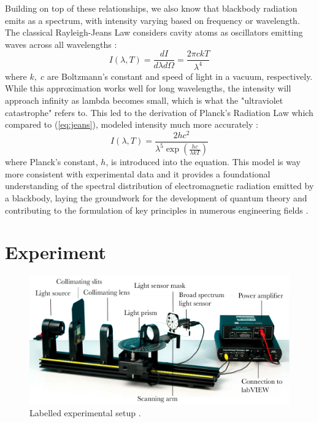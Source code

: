 \documentclass[12pt]{article}
\begin{document}
Building on top of these relationships, we also know that blackbody radiation emits as a spectrum, with intensity varying based on frequency or wavelength. The classical Rayleigh-Jeans Law considers cavity atoms as oscillators emitting waves across all wavelengths \autocite{manuall}:
\begin{equation}
    I(\lambda,T)=\frac{dI}{d\lambda d\Omega}=\frac{2\pi ckT}{\lambda^4}
    \label{eq:jeans}
\end{equation}
where $k,\;c$ are Boltzmann's constant and speed of light in a vacuum, respectively. While this approximation works well for long wavelengths, the intensity will approach infinity as lambda becomes small, which is what the "ultraviolet catastrophe" refers to. This led to the derivation of Planck's Radiation Law which compared to (\ref{eq:jeans}), modeled intensity much more accurately \autocite{planck1900theory}:
\begin{equation}
    I(\lambda,T)=\frac{2hc^2}{\lambda^5\exp\left(\frac{hc}{\lambda kT}\right)}
    \label{eq:planck}
\end{equation}
where Planck's constant, $h$, is introduced into the equation. This model is way more consistent with experimental data and it provides a foundational understanding of the spectral distribution of electromagnetic radiation emitted by a blackbody, laying the groundwork for the development of quantum theory and contributing to the formulation of key principles in numerous engineering fields \autocite{PhysRevLett.42.835}.

\section{Experiment}
\begin{figure}[htbp]
\centering
\includegraphics[width=0.875\columnwidth]{figure/aparatus.png}
\caption{Labelled experimental setup \autocite{boyer2018blackbody}.}
\label{fig:aparatus}
\end{figure}
\end{document}
